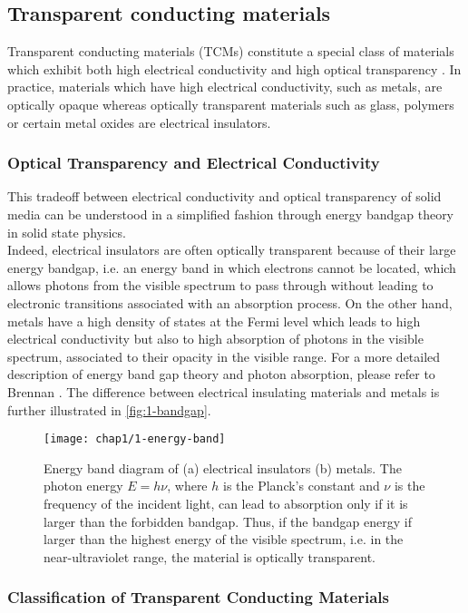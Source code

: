 \subsection{Transparent conducting materials}

    Transparent conducting materials (TCMs) constitute a special class of materials which exhibit both high electrical conductivity and high optical transparency \cite{Bardet2021}. In practice, materials which have high electrical conductivity, such as metals, are optically opaque whereas optically transparent materials such as glass, polymers or certain metal oxides are electrical insulators. 
    \subsubsection{Optical Transparency and Electrical Conductivity}
    This tradeoff between electrical conductivity and optical transparency of solid media can be understood in a simplified fashion through energy bandgap theory in solid state physics.\\
    Indeed, electrical insulators are often optically transparent because of their large energy bandgap, i.e. an energy band in which electrons cannot be located, which allows photons from the visible spectrum to pass through without leading to electronic transitions associated with an absorption process. On the other hand, metals have a high density of states at the Fermi level which leads to high electrical conductivity but also to high absorption of photons in the visible spectrum, associated to their opacity in the visible range. For a more detailed description of energy band gap theory and photon absorption, please refer to Brennan \cite{Brennan2010}. The difference between electrical insulating materials and metals is further illustrated in \autoref{fig:1-bandgap}.
    \begin{figure}[H]
        \centering
        \texttt{[image: chap1/1-energy-band]}
        \caption{Energy band diagram of (a) electrical insulators (b) metals. The photon energy $E=h\nu$, where $h$ is the Planck's constant and $\nu$ is the frequency of the incident light, can lead to absorption only if it is larger than the forbidden bandgap. Thus, if the bandgap energy if larger than the highest energy of the visible spectrum, i.e. in the near-ultraviolet range, the material is optically transparent.}
        \label{fig:1-bandgap}
    \end{figure}

    \subsubsection{Classification of Transparent Conducting Materials}

